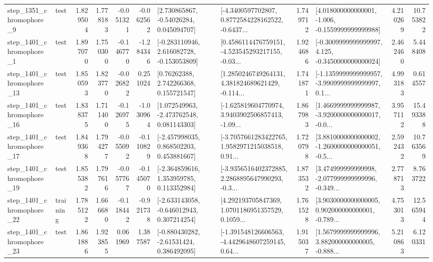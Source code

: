 \begin{tabular}{llrrrrllrlrr}
  step\_1351\_chromophore\_9 &      test &      1.829504 &    1.778183 &     -0.051321 & -0.062562 &     [2.730865867, -0.54026284, 0.045094707] &  [-4.3400597702807, 0.8772584228162522, -0.6437... &       1.749712 &   [4.018000000000001, -1.006, -0.1559999999999988] &            4.210269 &         10.753822 \\
  step\_1401\_chromophore\_1 &      test &      1.897070 &    1.750300 &     -0.146770 & -1.284346 &   [-0.283110946, 2.616082728, -0.153053809] &  [0.4586114476759151, -4.523545293217155, -0.03... &       1.924686 &  [-0.3009999999999997, 4.125, -0.3450000000000024] &            2.462460 &          5.448408 \\
 step\_1401\_chromophore\_13 &      test &      1.850593 &    1.823770 &     -0.026822 &  0.251024 &      [0.76262388, 2.742266368, 0.155721547] &  [1.2850246749264131, 4.381824689621429, -0.114... &       1.741871 &  [-1.1359999999999957, -3.9909999999999997, 0.1... &            4.993183 &          0.614557 \\
 step\_1401\_chromophore\_16 &      test &      1.838375 &    1.711400 &     -0.126975 & -1.030964 &    [1.072549963, -2.473762548, 0.081143303] &  [-1.625819604770974, 3.9403902506857413, -1.09... &       1.867983 &  [1.4669999999999987, -3.9200000000000017, -0.0... &            3.957112 &         15.493388 \\
 step\_1401\_chromophore\_17 &      test &      1.849368 &    1.794277 &     -0.055092 & -0.110829 &    [-2.457998035, 0.868502203, 0.453881667] &  [-3.7057661283422765, 1.9582971215038518, 0.91... &       1.720798 &  [3.8810000000000002, -1.2600000000000051, -0.5... &            2.592432 &         10.763569 \\
 step\_1401\_chromophore\_19 &      test &      1.855382 &    1.797616 &     -0.057767 & -0.145070 &    [-2.364859616, 1.353959785, 0.113352984] &  [-3.9356516402372885, 2.2868895647990293, -0.3... &       1.873532 &  [3.474999999999998, -2.077999999999996, -0.349... &            2.778713 &          8.763722 \\
 step\_1401\_chromophore\_22 &  training &      1.785122 &    1.666680 &     -0.118442 & -0.921738 &   [-2.633143058, -0.646012943, 0.307214254] &  [4.292193705847369, 1.0701186951357529, 0.1059... &       1.761528 &  [3.9030000000000005, 0.902000000000001, -0.789... &            4.753013 &         12.565944 \\
 step\_1401\_chromophore\_23 &      test &      1.861886 &    1.923855 &      0.061969 &  1.387587 &    [-0.880430282, -2.61531424, 0.386492095] &  [-1.391548126606563, -4.4429648607259145, 0.64... &       1.915037 &  [1.5679999999999996, 3.882000000000005, -0.888... &            5.210863 &          6.120331 \\

\end{tabular}
